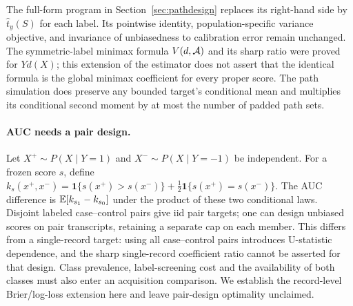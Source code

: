 The full-form program in Section~\ref{sec:pathdesign} replaces its
right-hand side by $\widehat t_y(S)$ for each label. Its pointwise identity,
population-specific variance objective, and invariance of unbiasedness to
calibration error remain unchanged. The symmetric-label minimax formula
$V(d,\mathcal A)$ and its sharp ratio were proved for $Yd(X)$; this extension of
the estimator does not assert that the identical formula is the global
minimax coefficient for every proper score. The path simulation does preserve
any bounded target's conditional mean and multiplies its conditional
second moment by at most the number of padded path sets.

\paragraph{AUC needs a pair design.}
Let $X^+\sim P(X\mid Y=1)$ and $X^-\sim P(X\mid Y=-1)$ be independent.
For a frozen score $s$, define
$k_s(x^+,x^-)=\mathbf1\{s(x^+)>s(x^-)\}
+\tfrac12\mathbf1\{s(x^+)=s(x^-)\}$.
The AUC difference is $\mathbb{E}[k_{s_1}-k_{s_0}]$ under the product of these two
conditional laws. Disjoint labeled case--control pairs give iid pair targets;
one can design unbiased scores on pair transcripts, retaining a separate
cap on each member. This differs from a single-record target: using all
case--control pairs introduces U-statistic dependence, and the sharp
single-record coefficient ratio cannot be asserted for that design.
Class prevalence, label-screening cost and the availability of both classes
must also enter an acquisition comparison. We establish the record-level
Brier/log-loss extension here and leave pair-design optimality unclaimed.
